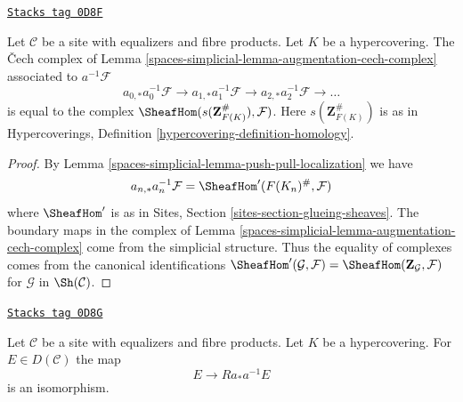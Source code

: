 \begin{lemma}
\label{spaces-simplicial-lemma-hypercovering-cech-complex}
\href{https://stacks.math.columbia.edu/tag/0D8F}{\texttt{Stacks tag 0D8F}}

Let $\mathcal{C}$ be a site with equalizers and fibre products.
Let $K$ be a hypercovering. The {\v C}ech complex
of Lemma \ref{spaces-simplicial-lemma-augmentation-cech-complex} associated to
$a^{-1}\mathcal{F}$
$$
a_{0, *}a_0^{-1}\mathcal{F} \to a_{1, *}a_1^{-1}\mathcal{F} \to
a_{2, *}a_2^{-1}\mathcal{F} \to \ldots
$$
is equal to the complex $\SheafHom(s(\mathbf{Z}_{F(K)}^\#), \mathcal{F})$.
Here $s(\mathbf{Z}_{F(K)}^\#)$ is as in
Hypercoverings, Definition \ref{hypercovering-definition-homology}.
\end{lemma}

\begin{proof}
By Lemma \ref{spaces-simplicial-lemma-push-pull-localization} we have
$$
a_{n, *}a_n^{-1}\mathcal{F} = \SheafHom'(F(K_n)^\#, \mathcal{F})
$$
where $\SheafHom'$ is as in Sites, Section \ref{sites-section-glueing-sheaves}.
The boundary maps in the complex of
Lemma \ref{spaces-simplicial-lemma-augmentation-cech-complex}
come from the simplicial structure.
Thus the equality of complexes comes
from the canonical identifications
$\SheafHom'(\mathcal{G}, \mathcal{F}) =
\SheafHom(\mathbf{Z}_\mathcal{G}, \mathcal{F})$ for
$\mathcal{G}$ in $\Sh(\mathcal{C})$.
\end{proof}

\begin{lemma}
\label{spaces-simplicial-lemma-hypercovering-descent-bounded-abelian}
\href{https://stacks.math.columbia.edu/tag/0D8G}{\texttt{Stacks tag 0D8G}}

Let $\mathcal{C}$ be a site with equalizers and fibre products.
Let $K$ be a hypercovering. For
$E \in D(\mathcal{C})$ the map
$$
E \longrightarrow Ra_*a^{-1}E
$$
is an isomorphism.
\end{lemma}

